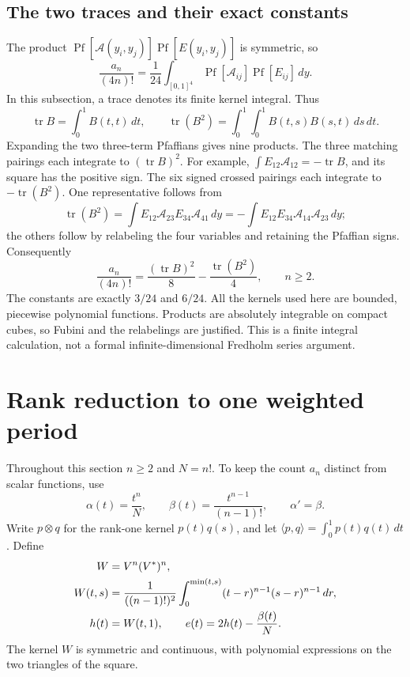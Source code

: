 \documentclass[11pt,letterpaper]{article}
\numberwithin{equation}{section}
\theoremstyle{definition}
\newcommand{\1}{\mathbf 1}
\newcommand{\ip}[2]{\langle #1,#2\rangle}
\DeclareMathOperator{\tr}{tr}
\DeclareMathOperator{\Pf}{Pf}
\newcommand{\dd}{\,d}
\begin{document}
\subsection{The two traces and their exact constants}
The product $\Pf[\mathcal A(y_i,y_j)]\Pf[E(y_i,y_j)]$ is symmetric, so
\begin{equation}
 \frac{a_n}{(4n)!}
 =\frac1{24}\int_{[0,1]^4}\Pf[\mathcal A_{ij}]\Pf[E_{ij}]\dd y.
 \label{shr:h4:eq:doublepf}
\end{equation}
In this subsection, a trace denotes its finite kernel integral. Thus
\[
 \tr B=\int_0^1B(t,t)\dd t,\qquad
 \tr(B^2)=\int_0^1\int_0^1B(t,s)B(s,t)\dd s\dd t.
\]
Expanding the two three-term Pfaffians gives nine products. The three
matching pairings each integrate to $(\tr B)^2$. For example,
$\int E_{12}\mathcal A_{12}=-\tr B$, and its square has the positive
sign. The six signed crossed pairings each integrate to $-\tr(B^2)$.
One representative follows from
\[
 \tr(B^2)=\int E_{12}\mathcal A_{23}E_{34}\mathcal A_{41}\dd y
 =-\int E_{12}E_{34}\mathcal A_{14}\mathcal A_{23}\dd y;
\]
the others follow by relabeling the four variables and retaining the
Pfaffian signs. Consequently
\begin{equation}
 \boxed{\displaystyle
 \frac{a_n}{(4n)!}=\frac{(\tr B)^2}{8}-\frac{\tr(B^2)}4,\qquad n\ge2.}
 \label{shr:h4:eq:traceformula}
\end{equation}
The constants are exactly $3/24$ and $6/24$. All the kernels used here
are bounded, piecewise polynomial functions. Products are absolutely
integrable on compact cubes, so Fubini and the relabelings are justified.
This is a finite integral calculation, not a formal infinite-dimensional
Fredholm series argument.

\section{Rank reduction to one weighted period}
\label{shr:h4:sec:rank}
Throughout this section $n\ge2$ and $N=n!$. To keep the count $a_n$
distinct from scalar functions, use
\begin{equation}
 \alpha(t)=\frac{t^n}{N},\qquad
 \beta(t)=\frac{t^{n-1}}{(n-1)!},\qquad \alpha'=\beta.
 \label{shr:h4:eq:alphabeta}
\end{equation}
Write $p\otimes q$ for the rank-one kernel $p(t)q(s)$, and let
$\ip pq=\int_0^1p(t)q(t)\dd t$. Define
\begin{align}
 W&=V^n(V^*)^n,\notag\\
 W(t,s)&=\frac1{((n-1)!)^2}
  \int_0^{\min(t,s)}(t-r)^{n-1}(s-r)^{n-1}\dd r,\label{shr:h4:eq:W}\\
 h(t)&=W(t,1),\qquad e(t)=2h(t)-\frac{\beta(t)}N.\notag
\end{align}
The kernel $W$ is symmetric and continuous, with polynomial expressions
on the two triangles of the square.
\end{document}
